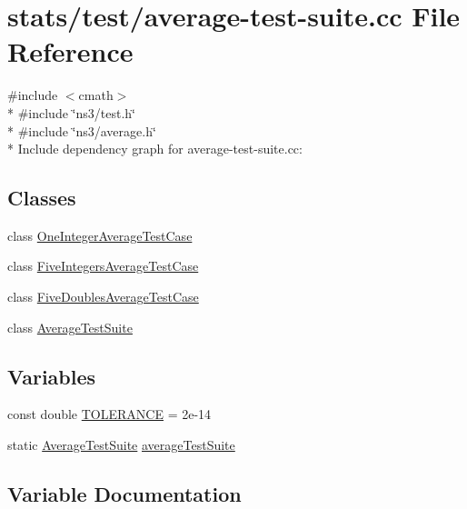 \hypertarget{average-test-suite_8cc}{}\section{stats/test/average-\/test-\/suite.cc File Reference}
\label{average-test-suite_8cc}
{\ttfamily \#include $<$cmath$>$}\\*
{\ttfamily \#include \char`\"{}ns3/test.\+h\char`\"{}}\\*
{\ttfamily \#include \char`\"{}ns3/average.\+h\char`\"{}}\\*
Include dependency graph for average-\/test-\/suite.cc\+:
\subsection*{Classes}
\begin{DoxyCompactItemize}
\item 
class \hyperlink{classOneIntegerAverageTestCase}{One\+Integer\+Average\+Test\+Case}
\item 
class \hyperlink{classFiveIntegersAverageTestCase}{Five\+Integers\+Average\+Test\+Case}
\item 
class \hyperlink{classFiveDoublesAverageTestCase}{Five\+Doubles\+Average\+Test\+Case}
\item 
class \hyperlink{classAverageTestSuite}{Average\+Test\+Suite}
\end{DoxyCompactItemize}
\subsection*{Variables}
\begin{DoxyCompactItemize}
\item 
const double \hyperlink{average-test-suite_8cc_a89311a98397f9d6967d2cb10d5152d77}{T\+O\+L\+E\+R\+A\+N\+CE} = 2e-\/14
\item 
static \hyperlink{classAverageTestSuite}{Average\+Test\+Suite} \hyperlink{average-test-suite_8cc_a171320b9b4409da9b1934660eda13898}{average\+Test\+Suite}
\end{DoxyCompactItemize}


\subsection{Variable Documentation}
